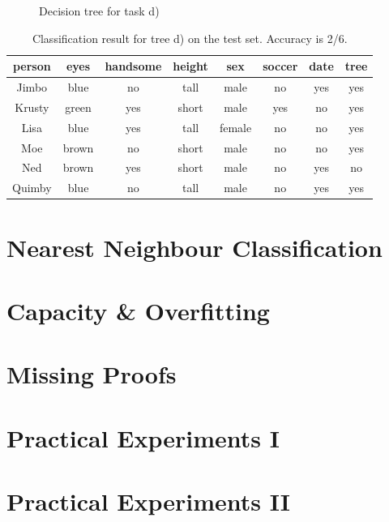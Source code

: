 \documentclass{scrartcl}
\begin{document}
\begin{figure}
\centering 
{}
\caption{Decision tree for task d)}
\label{fig:tree-ralph}
\end{figure}

\begin{table}[h!]
  \centering
  \begin{tabular}{cccccc|c|c}
    \toprule
    person      & eyes  & handsome & height & sex    & soccer & date & tree\\
    \midrule
    Jimbo       & blue  & no       & tall   & male   & no     & yes & yes\\
    Krusty      & green & yes      & short  & male   & yes    & no  & yes\\
    Lisa        & blue  & yes      & tall   & female & no     & no  & yes\\
    Moe         & brown & no       & short  & male   & no     & no  & yes\\
    Ned         & brown & yes      & short  & male   & no     & yes & no \\
    Quimby      & blue  & no       & tall   & male   & no     & yes & yes\\
    \bottomrule
  \end{tabular}
  \caption{Classification result for tree d) on the test set. Accuracy is 2/6.}
\end{table}

\section{Nearest Neighbour Classification}
\section{Capacity \& Overfitting}
\section{Missing Proofs}
\section{Practical Experiments I}
\section{Practical Experiments II}

\begin{appendix}




  
\end{appendix}
  
\end{document}
